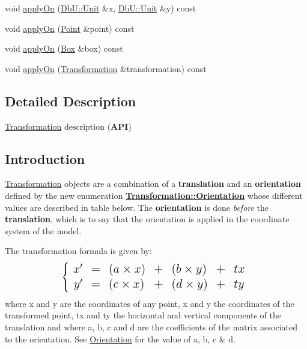 \begin{DoxyCompactItemize}
void \mbox{\hyperlink{classHurricane_1_1Transformation_ad37365bfd47851ca33519bb9a05b5402}{apply\+On}} (\mbox{\hyperlink{group__DbUGroup_ga4fbfa3e8c89347af76c9628ea06c4146}{Db\+U\+::\+Unit}} \&x, \mbox{\hyperlink{group__DbUGroup_ga4fbfa3e8c89347af76c9628ea06c4146}{Db\+U\+::\+Unit}} \&y) const
\item 
void \mbox{\hyperlink{classHurricane_1_1Transformation_ae73ca0f0e10d85267ef685d94eda9bcc}{apply\+On}} (\mbox{\hyperlink{classHurricane_1_1Point}{Point}} \&point) const
\item 
void \mbox{\hyperlink{classHurricane_1_1Transformation_aa3ab2731934330107a3f2a3079f21132}{apply\+On}} (\mbox{\hyperlink{classHurricane_1_1Box}{Box}} \&box) const
\item 
void \mbox{\hyperlink{classHurricane_1_1Transformation_a3ac2c40977ecf061b4316ecedc87918a}{apply\+On}} (\mbox{\hyperlink{classHurricane_1_1Transformation}{Transformation}} \&transformation) const
\end{DoxyCompactItemize}


\subsection{Detailed Description}
\mbox{\hyperlink{classHurricane_1_1Transformation}{Transformation}} description ({\bfseries A\+PI}) 

\hypertarget{classHurricane_1_1Transformation_secTransformationIntro}{}\subsection{Introduction}\label{classHurricane_1_1Transformation_secTransformationIntro}
\mbox{\hyperlink{classHurricane_1_1Transformation}{Transformation}} objects are a combination of a {\bfseries translation} and an {\bfseries orientation} defined by the new enumeration {\bfseries \mbox{\hyperlink{classHurricane_1_1Transformation_1_1Orientation}{Transformation\+::\+Orientation}}} whose different values are described in table below. The {\bfseries orientation} is done {\itshape before} the {\bfseries translation}, which is to say that the orientation is applied in the coordinate system of the model.

The transformation formula is given by\+: \[ \Large \left \{ \begin{array}{r c l l l l l} x' & = & (a \times x) & + & (b \times y) & + & tx \\ y' & = & (c \times x) & + & (d \times y) & + & ty \end{array} \right . \] where x and y are the coordinates of any point, x\textquotesingle{} and y\textquotesingle{} the coordinates of the transformed point, tx and ty the horizontal and vertical components of the translation and where a, b, c and d are the coefficients of the matrix associated to the orientation. See \mbox{\hyperlink{classHurricane_1_1Transformation_1_1Orientation}{Orientation}} for the value of a, b, c \& d.


